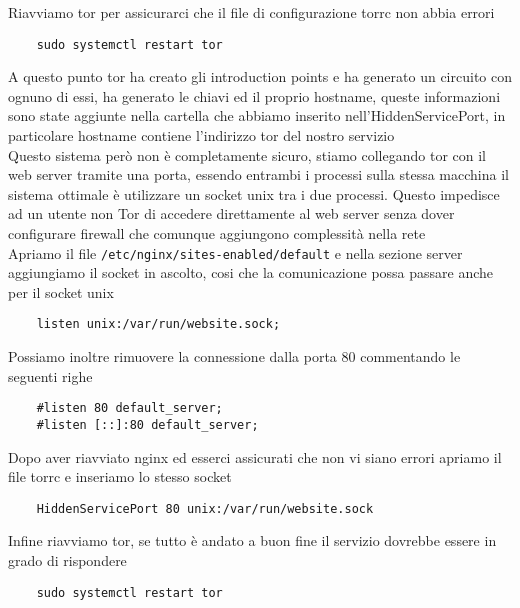 Riavviamo tor per assicurarci che il file di configurazione torrc non abbia errori
\begin{lstlisting}
    sudo systemctl restart tor
\end{lstlisting}
A questo punto tor ha creato gli introduction points e ha generato un circuito con ognuno di essi, ha generato le chiavi ed il proprio hostname, queste informazioni sono state aggiunte nella cartella che abbiamo inserito nell'HiddenServicePort, in particolare hostname contiene l'indirizzo tor del nostro servizio \cite{SetupOnionService} \\
Questo sistema però non è completamente sicuro, stiamo collegando tor con il web server tramite una porta, essendo entrambi i processi sulla stessa macchina il sistema ottimale è utilizzare un socket unix tra i due processi. Questo impedisce ad un utente non Tor di accedere direttamente al web server senza dover configurare firewall che comunque aggiungono complessità nella rete \\
Apriamo il file \lstinline{/etc/nginx/sites-enabled/default} e nella sezione server aggiungiamo il socket in ascolto, cosi che la comunicazione possa passare anche per il socket unix
\begin{lstlisting}
    listen unix:/var/run/website.sock;
\end{lstlisting}
Possiamo inoltre rimuovere la connessione dalla porta 80 commentando le seguenti righe
\begin{lstlisting}
    #listen 80 default_server;
    #listen [::]:80 default_server;
\end{lstlisting}
Dopo aver riavviato nginx ed esserci assicurati che non vi siano errori apriamo il file torrc e inseriamo lo stesso socket
\begin{lstlisting}
    HiddenServicePort 80 unix:/var/run/website.sock
\end{lstlisting}
Infine riavviamo tor, se tutto è andato a buon fine il servizio dovrebbe essere in grado di rispondere
\begin{lstlisting}
    sudo systemctl restart tor
\end{lstlisting}


